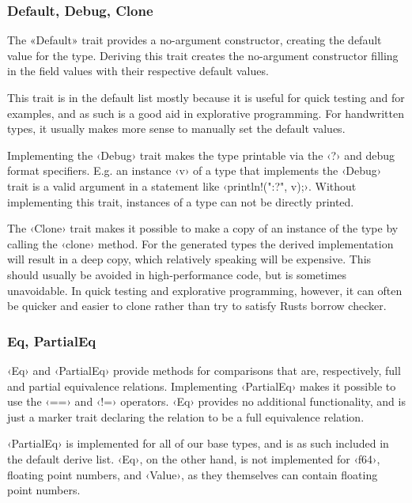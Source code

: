 
\subsubsection{Default, Debug, Clone}

The «Default» trait provides a no-argument constructor, creating the default value for the type. Deriving this trait creates the no-argument constructor filling in the field values with their respective default values.

This trait is in the default list mostly because it is useful for quick testing and for examples, and as such is a good aid in explorative programming. For handwritten types, it usually makes more sense to manually set the default values.

Implementing the ‹Debug› trait makes the type printable via the ‹?› and  debug format specifiers. E.g. an instance ‹v› of a type that implements the ‹Debug› trait is a valid argument in a statement like ‹println!("{:?}", v);›. Without implementing this trait, instances of a type can not be directly printed.

The ‹Clone› trait makes it possible to make a copy of an instance of the type by calling the ‹clone› method. For the generated types the derived implementation will result in a deep copy, which relatively speaking will be expensive. This should usually be avoided in high-performance code, but is sometimes unavoidable. In quick testing and explorative programming, however, it can often be quicker and easier to clone rather than try to satisfy Rusts borrow checker.

\subsubsection{Eq, PartialEq}

‹Eq› and ‹PartialEq› provide methods for comparisons that are, respectively, full and partial equivalence relations. Implementing ‹PartialEq› makes it possible to use the ‹==› and ‹!=› operators. ‹Eq› provides no additional functionality, and is just a marker trait declaring the relation to be a full equivalence relation.

‹PartialEq› is implemented for all of our base types, and is as such included in the default derive list. ‹Eq›, on the other hand, is not implemented for ‹f64›, floating point numbers, and ‹Value›, as they themselves can contain floating point numbers.

